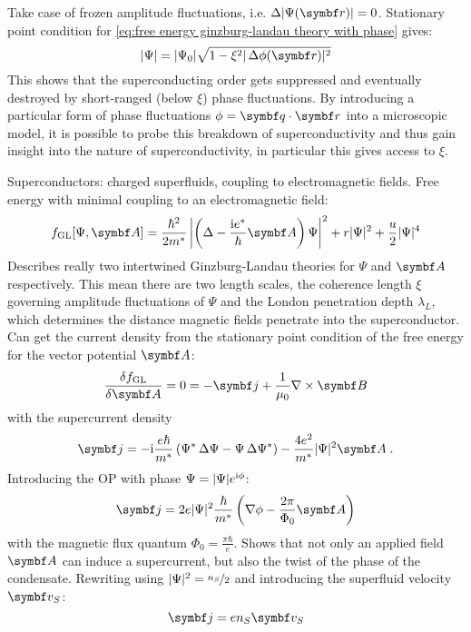 \documentclass[../notes.tex]{subfiles}
\begin{document}
Take case of frozen amplitude fluctuations, i.e. \(\adif{\vert \Psi (\vb{r}) \vert} = 0\).
Stationary point condition for \cref{eq:free energy ginzburg-landau theory with phase} gives:
\begin{equation}
	\vert \Psi \vert = \vert \Psi_0 \vert \sqrt{1 - \xi^2 \vert \adif{\phi} (\vb{r}) \vert^2}
	\label{eq:breakdown of OP with phase fluctuations}
\end{equation}
This shows that the superconducting order gets suppressed and eventually destroyed by short-ranged (below \(\xi\)) phase fluctuations.
By introducing a particular form of phase fluctuations \(\phi = \vb{q} \cdot \vb{r}\) into a microscopic model, it is possible to probe this breakdown of superconductivity and thus gain insight into the nature of superconductivity, in particular this gives access to \(\xi\).

Superconductors: charged superfluids, coupling to electromagnetic fields.
Free energy with minimal coupling to an electromagnetic field:
\begin{equation}
	f_{\mathrm{GL}} [\Psi, \vb{A}] = \frac{\hbar^2}{2 m^*} \left\vert \left( \Delta - \frac{\iu e^*}{\hbar} \vb{A} \right) \Psi \right\vert^2 + r \vert \Psi \vert^2 + \frac{u}{2} \vert \Psi \vert^4
	\label{eq:GL energy with minimal coupling to EM field}
\end{equation}
Describes really two intertwined Ginzburg-Landau theories for \(\Psi\) and \(\vb{A}\) respectively.
This mean there are two length scales, the coherence length \(\xi\) governing amplitude fluctuations of \(\Psi\) and the London penetration depth \(\lambda_L\), which determines the distance magnetic fields penetrate into the superconductor.
Can get the current density from the stationary point condition of the free energy for the vector potential \(\vb{A}\):
\begin{equation}
	\fdv{f_{\mathrm{GL}}}{\vb{A}} = 0 = -\vb{j} + \frac{1}{\mu_0} \nabla \times \vb{B}
\end{equation}
with the supercurrent density
\begin{equation}
	\vb{j} = -\iu \frac{e\hbar}{m^*} \left(\Psi^* \adif{\Psi} - \Psi \adif{\Psi^*}\right) - \frac{4 e^2}{m^*} \vert \Psi \vert^2 \vb{A} \;.
\end{equation}
Introducing the OP with phase \(\Psi = \vert \Psi \vert e^{\mathrm{i} \phi}\):
\begin{equation}
	\vb{j} = 2 e \vert \Psi \vert^2 \frac{\hbar}{m^*} \left(\nabla \phi - \frac{2 \pi}{\Phi_0} \vb{A} \right)
\end{equation}
with the magnetic flux quantum \(\Phi_0 = \frac{\pi \hbar}{e}\).
Shows that not only an applied field \(\vb{A}\) can induce a supercurrent, but also the twist of the phase of the condensate.
Rewriting using \(\vert \Psi \vert^2 = \nicefrac{n_S}{2}\)  and introducing the superfluid velocity \(\vb{v}_S\):
\begin{equation}
	\vb{j} = e n_S \vb{v}_S
\end{equation}
\end{document}
